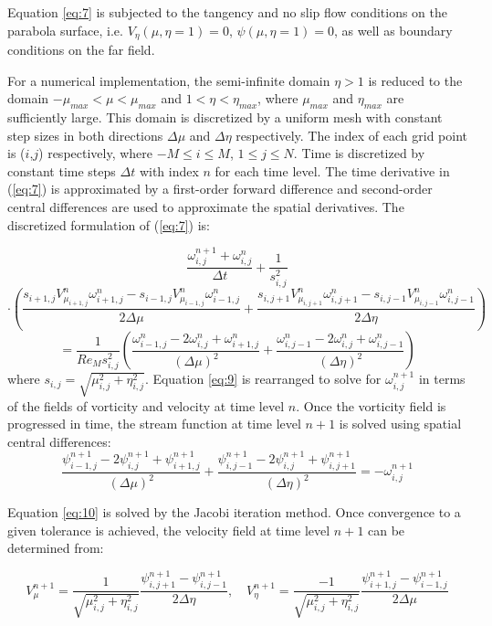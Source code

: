 \documentclass{article}
\begin{document}
Equation \ref{eq:7} is subjected to the tangency and no slip flow conditions on the parabola surface, i.e. $V_\eta(\mu,\eta=1) = 0$, $\psi(\mu,\eta=1) = 0$, as well as boundary conditions on the far field.

For a numerical implementation, the semi-infinite domain $\eta > 1$ is reduced to the domain $-\mu_{max} < \mu < \mu_{max}$ and $1 < \eta < \eta_{max}$, where $\mu_{max}$ and $\eta_{max}$ are sufficiently large. This domain is discretized by a uniform mesh with constant step sizes in both directions $\Delta \mu$ and $\Delta \eta$ respectively. The index of each grid point is ($i$,$j$) respectively, where $-M \le i \le M$, $1 \le j \le N$. Time is discretized by constant time steps $\Delta t$ with index $n$ for each time level. The time
derivative in
(\ref{eq:7})
is approximated by a first-order forward difference and second-order central
differences are used to approximate the spatial derivatives. The discretized formulation of (\ref{eq:7}) is:

\[
\frac{\omega^{n+1}_{i,j}+\omega^n_{i,j}}{\Delta t} + \frac{1}{s^2_{i,j}}
\]
\[
\cdot \left(
\frac{s_{i+1,j}V^n_{\mu_{i+1,j}}\omega^n_{i+1,j}-s_{i-1,j}V^n_{\mu_{i-1,j}}\omega^n_{i-1,j}}
     {2\Delta\mu}
+
\frac{s_{i,j+1}V^n_{\mu_{i,j+1}}\omega^n_{i,j+1}-s_{i,j-1}V^n_{\mu_{i,j-1}}\omega^n_{i,j-1}}
     {2\Delta\eta}
\right)
\]
\begin{equation}
\label{eq:9}
=\frac{1}{Re_M s^2_{i,j}}
\left(
\frac{\omega^n_{i-1,j}-2\omega^n_{i,j}+\omega^n_{i+1,j}}{(\Delta\mu)^2}
+
\frac{\omega^n_{i,j-1}-2\omega^n_{i,j}+\omega^n_{i,j-1}}{(\Delta\eta)^2}
\right)
\end{equation}
where $s_{i,j}=\sqrt{\mu^2_{i,j}+\eta^2_{i,j}}$.
Equation \ref{eq:9} is rearranged to solve for $\omega^{n+1}_{i,j}$ in terms of the fields of
vorticity and velocity at time level $n$.
Once the vorticity field is progressed in time, the stream
function at time level $n+1$ is solved using spatial central differences:
\begin{equation}
\label{eq:10}
\frac{\psi^{n+1}_{i-1,j}-2\psi^{n+1}_{i,j}+\psi^{n+1}_{i+1,j}}{(\Delta\mu)^2}+
\frac{\psi^{n+1}_{i,j-1}-2\psi^{n+1}_{i,j}+\psi^{n+1}_{i,j+1}}{(\Delta\eta)^2}
=-\omega^{n+1}_{i,j}
\end{equation}

Equation \ref{eq:10} is solved by the Jacobi iteration method. Once convergence to a given tolerance is achieved, the velocity field at time level $n+1$ can be determined from:

\begin{equation}
\label{eq:11}
V_\mu^{n+1}=\frac{1}{\sqrt{\mu_{i,j}^2+\eta_{i,j}^2}} \frac{\psi_{i,j+1}^{n+1} - \psi_{i,j-1}^{n+1}}{2\Delta \eta}, \quad V_\eta^{n+1}=\frac{-1}{\sqrt{\mu_{i,j}^2+\eta_{i,j}^2}} \frac{\psi_{i+1,j}^{n+1} - \psi_{i-1,j}^{n+1}}{2\Delta \mu}
\end{equation}
\end{document}
